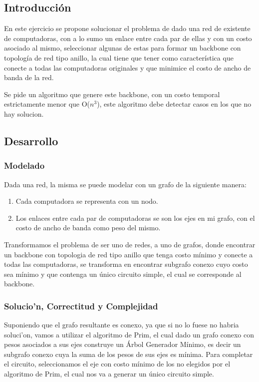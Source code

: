 \subsection{Introducci\'on} 

En este ejercicio se propone solucionar el problema de dado una red de existente de computadoras, con a lo sumo un enlace entre cada par de ellas y con un costo asociado al mismo, seleccionar algunas de estas para formar un backbone con topología de red tipo anillo, la cual tiene que tener como característica que conecte a todas las computadoras originales y que minimice el costo de ancho de banda de la red.

Se pide un algoritmo que genere este backbone, con un costo temporal estrictamente menor que O($n^3$), este algoritmo debe detectar casos en los que no hay solucion.

\subsection{Desarrollo}

\subsubsection{Modelado}

Dada una red, la misma se puede modelar con un grafo de la siguiente manera:

\begin{enumerate}
	\item Cada computadora se representa con un nodo.
	\item Los enlaces entre cada par de computadoras se son los ejes en mi grafo, con el costo de ancho de banda como peso del mismo.
\end{enumerate}

Transformamos el problema de ser uno de redes, a uno de grafos, donde encontrar un backbone con topologia de red tipo anillo que tenga costo mínimo y conecte a todas las computadoras, se transforma en encontrar subgrafo conexo cuyo costo sea mínimo y que contenga un único circuito simple, el cual se corresponde al backbone.

\subsubsection{Solucio'n, Correctitud y Complejidad}

Suponiendo que el grafo resultante es conexo, ya que si no lo fuese no habria soluci'on, vamos a utilizar el algoritmo de Prim, el cual dado un grafo conexo con pesos asociados a sus ejes construye un Árbol Generador Mínimo, es decir un subgrafo conexo cuya la suma de los pesos de sus ejes es mínima. Para completar el circuito, seleccionamos el eje con costo mínimo de los no elegidos por el algoritmo de Prim, el cual nos va a generar un único circuito simple.

